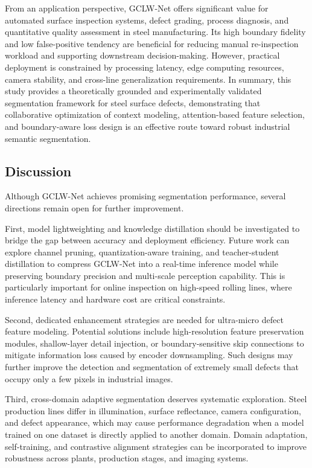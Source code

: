 \documentclass[sn-basic]{sn-jnl}
\theoremstyle{thmstyleone}%
\theoremstyle{thmstyletwo}%
\theoremstyle{thmstylethree}%
\begin{document}
From an application perspective, GCLW-Net offers significant value for automated surface inspection systems, defect grading, process diagnosis, and quantitative quality assessment in steel manufacturing. Its high boundary fidelity and low false-positive tendency are beneficial for reducing manual re-inspection workload and supporting downstream decision-making. However, practical deployment is constrained by processing latency, edge computing resources, camera stability, and cross-line generalization requirements. In summary, this study provides a theoretically grounded and experimentally validated segmentation framework for steel surface defects, demonstrating that collaborative optimization of context modeling, attention-based feature selection, and boundary-aware loss design is an effective route toward robust industrial semantic segmentation.

\subsection{Discussion}\label{sec5.2}
Although GCLW-Net achieves promising segmentation performance, several directions remain open for further improvement.

First, model lightweighting and knowledge distillation should be investigated to bridge the gap between accuracy and deployment efficiency. Future work can explore channel pruning, quantization-aware training, and teacher-student distillation to compress GCLW-Net into a real-time inference model while preserving boundary precision and multi-scale perception capability. This is particularly important for online inspection on high-speed rolling lines, where inference latency and hardware cost are critical constraints.

Second, dedicated enhancement strategies are needed for ultra-micro defect feature modeling. Potential solutions include high-resolution feature preservation modules, shallow-layer detail injection, or boundary-sensitive skip connections to mitigate information loss caused by encoder downsampling. Such designs may further improve the detection and segmentation of extremely small defects that occupy only a few pixels in industrial images.

Third, cross-domain adaptive segmentation deserves systematic exploration. Steel production lines differ in illumination, surface reflectance, camera configuration, and defect appearance, which may cause performance degradation when a model trained on one dataset is directly applied to another domain. Domain adaptation, self-training, and contrastive alignment strategies can be incorporated to improve robustness across plants, production stages, and imaging systems.
\end{document}
